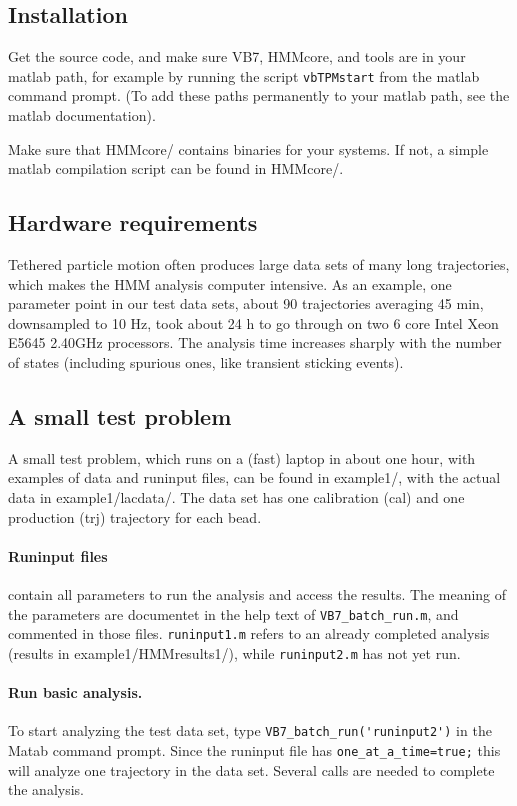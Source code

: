 \subsection{Installation}
Get the source code, and make sure VB7, HMMcore, and tools are in your
matlab path, for example by running the script \verb+vbTPMstart+ from
the matlab command prompt. (To add these paths permanently to your
matlab path, see the matlab documentation).

Make sure that HMMcore/ contains binaries for your systems. If not, a
simple matlab compilation script can be found in HMMcore/.

\subsection{Hardware requirements}
Tethered particle motion often produces large data sets of many long
trajectories, which makes the HMM analysis computer intensive. As an
example, one parameter point in our test data sets, about 90
trajectories averaging 45 min, downsampled to 10 Hz, took about 24 h
to go through on two 6 core Intel Xeon E5645 2.40GHz processors. The
analysis time increases sharply with the number of states (including
spurious ones, like transient sticking events).
\subsection{A small test problem}
A small test problem, which runs on a (fast) laptop in about one hour,
with examples of data and runinput files, can be found in example1/,
with the actual data in example1/lacdata/.  The data set has one
calibration (cal) and one production (trj) trajectory for each bead.

\paragraph{Runinput files} 
contain all parameters to run the analysis and access the results. The
meaning of the parameters are documentet in the help text of
\verb+VB7_batch_run.m+, and commented in those files.
\verb+runinput1.m+ refers to an already completed analysis (results in
example1/HMMresults1/), while \verb+runinput2.m+ has not yet run.

\paragraph{Run basic analysis.}
To start analyzing the test data set, type
\verb+VB7_batch_run('runinput2')+ in the Matab command prompt. Since
the runinput file has \verb+one_at_a_time=true;+ this will analyze one
trajectory in the data set. Several calls are needed to complete the
analysis. 

